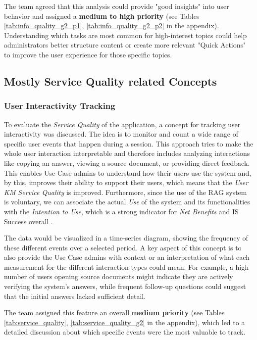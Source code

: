 \documentclass[
	english,
	ruledheaders=section,%
	class=report,%
	thesis={type=bachelor},%
	accentcolor=1b,%
	custommargins=true,%
	marginpar=false,%
	parskip=half-,%
	fontsize=11pt,%
	DIV=14,
]{tudapub}
\begin{document}
The team agreed that this analysis could provide "good insights" into user behavior and assigned a \textbf{medium to high priority} (see Tables \ref{tab:info_quality_g2_p1}, \ref{tab:info_quality_g2_p2} in the appendix). Understanding which tasks are most common for high-interest topics could help administrators better structure content or create more relevant "Quick Actions" to improve the user experience for those specific topics.
\subsection{Mostly Service Quality related Concepts}
\subsubsection{User Interactivity Tracking}
To evaluate the \textit{Service Quality} \parencite[p.~18]{DeloneMcLean2003ISSuccessTenYearUpdate} of the application, a concept for tracking user interactivity was discussed. The idea is to monitor and count a wide range of specific user events that happen during a session. This approach tries to make the whole user interaction interpretable and therefore includes analyzing interactions like copying an answer, viewing a source document, or providing direct feedback. This enables Use Case admins to understand how their users use the system and, by this, improves their ability to support their users, which means that the \textit{User KM Service Quality} \parencite[pp.~58--59]{Jennex2006} is improved. Furthermore, since the use of the RAG system is voluntary, we can associate the actual \textit{Use} of the system and its functionalities with the \textit{Intention to Use}, which is a strong indicator for \textit{Net Benefits} and IS Success overall \parencite[pp.~23--24]{DeloneMcLean2003ISSuccessTenYearUpdate}.

The data would be visualized in a time-series diagram, showing the frequency of these different events over a selected period. A key aspect of this concept is to also provide the Use Case admins with context or an interpretation of what each measurement for the different interaction types could mean. For example, a high number of users opening source documents might indicate they are actively verifying the system's answers, while frequent follow-up questions could suggest that the initial answers lacked sufficient detail.

The team assigned this feature an overall \textbf{medium priority} (see Tables \ref{tab:service_quality}, \ref{tab:service_quality_g2} in the appendix), which led to a detailed discussion about which specific events were the most valuable to track.
\end{document}
